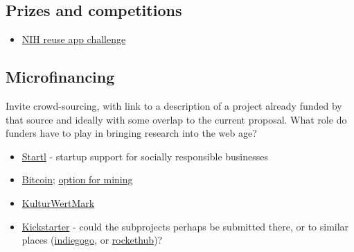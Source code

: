 \documentclass[final,authoryear,3p]{elsarticle-open-drafting}
\begin{document}
\subsection{Prizes and competitions}
\begin{itemize}
	\item \href{http://challenge.gov/NIH/132-nlm-show-off-your-apps-innovative-uses-of-nlm-information}{NIH reuse app challenge}
\end{itemize}

\subsection{Microfinancing}
Invite crowd-sourcing, with link to a description of a project already funded by that source and ideally with some overlap to the current proposal. What role do funders have to play in bringing research into the web age?
\begin{itemize}
	\item \href{http://startl.org/}{Startl} - startup support for socially responsible businesses
	\item \href{https://en.bitcoin.it/wiki/Introduction#Preventing_double-spending}{Bitcoin}; \href{http://www.bitcoinplus.com}{option for mining}
	\item \href{http://www.ccc.de/en/updates/2011/kulturwertmark}{KulturWertMark}
	\item \href{http://blog.kickstarter.com/post/5014573685/happy-birthday-kickstarter}{Kickstarter} - could the subprojects perhaps be submitted there, or to similar places (\href{http://www.indiegogo.com/}{indiegogo}, or \href{http://www.rockethub.com/}{rockethub})?

\end{itemize}
\end{document}

